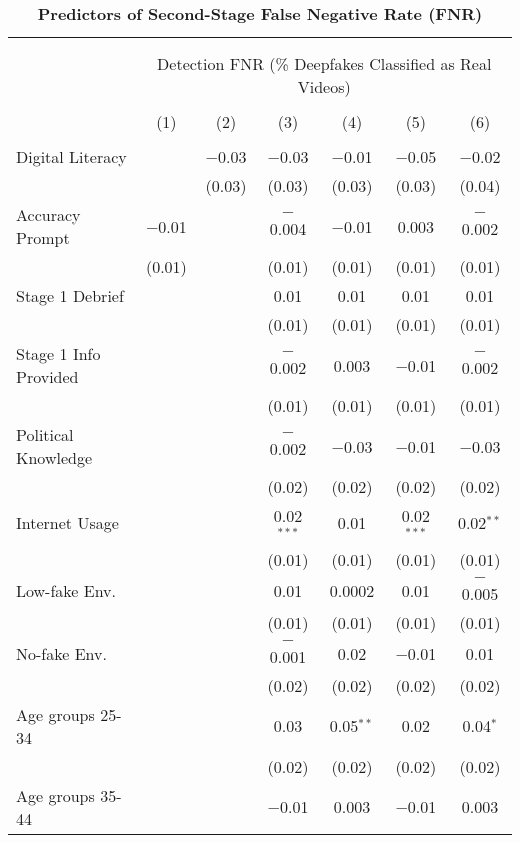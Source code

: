 
\begin{table}[!htbp] \centering 
  \caption{\textbf{Predictors of Second-Stage False Negative Rate (FNR)}} 
  \label{secondstage_fnr} 
\footnotesize 
\begin{tabular}{@{\extracolsep{1pt}}lcccccc} 
\\[-1.8ex]\hline 
\hline \\[-1.8ex] 
\\[-1.8ex] & \multicolumn{6}{c}{\normalsize Detection FNR (\% Deepfakes Classified as Real Videos)} \\ 
\\[-1.8ex] & (1) & (2) & (3) & (4) & (5) & (6)\\ 
\hline \\[-1.8ex] 
 Digital Literacy &  & $-$0.03 & $-$0.03 & $-$0.01 & $-$0.05 & $-$0.02 \\ 
  &  & (0.03) & (0.03) & (0.03) & (0.03) & (0.04) \\ 
  Accuracy Prompt & $-$0.01 &  & $-$0.004 & $-$0.01 & 0.003 & $-$0.002 \\ 
  & (0.01) &  & (0.01) & (0.01) & (0.01) & (0.01) \\ 
  Stage 1 Debrief &  &  & 0.01 & 0.01 & 0.01 & 0.01 \\ 
  &  &  & (0.01) & (0.01) & (0.01) & (0.01) \\ 
  Stage 1 Info Provided &  &  & $-$0.002 & 0.003 & $-$0.01 & $-$0.002 \\ 
  &  &  & (0.01) & (0.01) & (0.01) & (0.01) \\ 
  Political Knowledge &  &  & $-$0.002 & $-$0.03 & $-$0.01 & $-$0.03 \\ 
  &  &  & (0.02) & (0.02) & (0.02) & (0.02) \\ 
  Internet Usage &  &  & 0.02$^{***}$ & 0.01 & 0.02$^{***}$ & 0.02$^{**}$ \\ 
  &  &  & (0.01) & (0.01) & (0.01) & (0.01) \\ 
  Low-fake Env. &  &  & 0.01 & 0.0002 & 0.01 & $-$0.005 \\ 
  &  &  & (0.01) & (0.01) & (0.01) & (0.01) \\ 
  No-fake Env. &  &  & $-$0.001 & 0.02 & $-$0.01 & 0.01 \\ 
  &  &  & (0.02) & (0.02) & (0.02) & (0.02) \\ 
  Age groups 25-34 &  &  & 0.03 & 0.05$^{**}$ & 0.02 & 0.04$^{*}$ \\ 
  &  &  & (0.02) & (0.02) & (0.02) & (0.02) \\ 
  Age groups 35-44 &  &  & $-$0.01 & 0.003 & $-$0.01 & 0.003 \\ 

\end{tabular}
\end{table}

